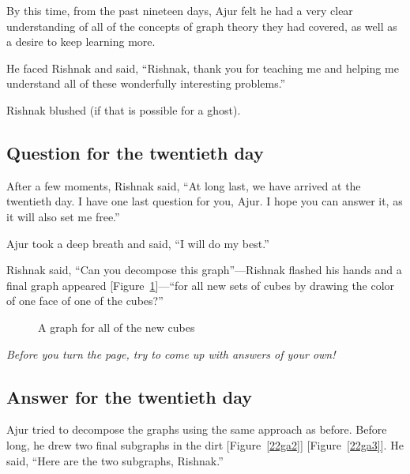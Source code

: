 By this time, from the past nineteen days, Ajur felt he had a very clear understanding of all of the concepts of graph theory they had covered, as well as a desire to keep learning more.

He faced Rishnak and said, ``Rishnak, thank you for teaching me and helping me understand all of these wonderfully interesting problems.''

Rishnak blushed (if that is possible for a ghost).

\subsection*{Question for the twentieth day}
After a few moments, Rishnak said, ``At long last, we have arrived at the twentieth day. I have one last question for you, Ajur. I hope you can answer it, as it will also set me free.''

Ajur took a deep breath and said, ``I will do my best.''

Rishnak said, ``Can you decompose this graph''---Rishnak flashed his hands and a final graph appeared [Figure~\ref{22q1}]---``for all new sets of cubes by drawing the color of one face of one of the cubes?''

\begin{figure}[h]
\begin{center}
\caption{A graph for all of the new cubes}\label{22q1}
\end{center}
\end{figure}

\textit{Before you turn the page, try to come up with answers of your own!}

\newpage
\subsection*{Answer for the twentieth day}
Ajur tried to decompose the graphs using the same approach as before.
Before long, he drew two final subgraphs in the dirt [Figure~\ref{22ga2}] [Figure~\ref{22ga3}].
He said, ``Here are the two subgraphs, Rishnak.''

